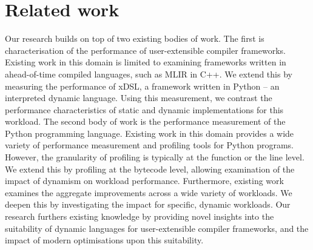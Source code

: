 


\chapter{Related work}
\label{chap:related-work}

%
%

Our research builds on top of two existing bodies of work.
The first is characterisation of the performance of user-extensible compiler frameworks. Existing work in this domain is limited to examining frameworks written in ahead-of-time compiled languages, such as MLIR in C++.
We extend this by measuring the performance of xDSL, a framework written in Python -- an interpreted dynamic language. Using this measurement, we contrast the performance characteristics of static and dynamic implementations for this workload.
The second body of work is the performance measurement of the Python programming language. Existing work in this domain provides a wide variety of performance measurement and profiling tools for Python programs. However, the granularity of profiling is typically at the function or the line level.
We extend this by profiling at the bytecode level, allowing examination of the impact of dynamism on workload performance.
Furthermore, existing work examines the aggregate improvements across a wide variety of workloads.
We deepen this by investigating the impact for specific, dynamic workloads.
Our research furthers existing knowledge by providing novel insights into the suitability of dynamic languages for user-extensible compiler frameworks, and the impact of modern optimisations upon this suitability.





